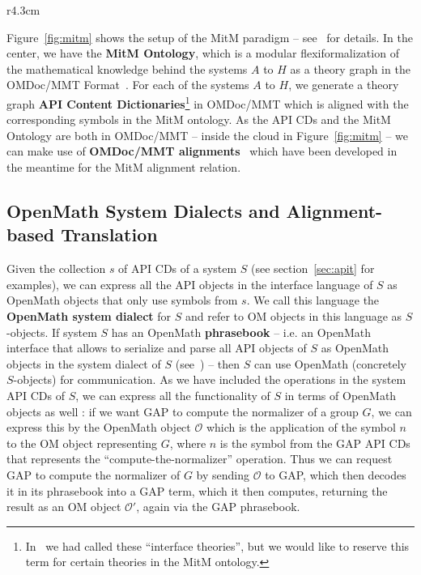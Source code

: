 \begin{wrapfigure}r{4.3cm}\vspace*{-2em}
  \vspace*{-1em}
  \caption{MitM Paradigm}\label{fig:mitm}\vspace*{-1.5em}
\end{wrapfigure}
Figure~\ref{fig:mitm} shows the setup of the MitM paradigm -- see~\cite{DehKohKon:iop16}
for details. In the center, we have the \textbf{MitM Ontology}, which is a modular
flexiformalization of the mathematical knowledge behind the systems $A$ to $H$ as a theory
graph in the OMDoc/MMT Format~\cite{Kohlhase:OMDoc1.2,RabKoh:WSMSML13,uniformal:on}. For
each of the systems $A$ to $H$, we generate a theory graph \textbf{API Content
  Dictionaries}\footnote{In~\cite{DehKohKon:iop16} we had called these ``interface
  theories'', but we would like to reserve this term for certain theories in the MitM
  ontology.}
in OMDoc/MMT which is aligned with the corresponding symbols in the MitM ontology. As the
API CDs and the MitM Ontology are both in OMDoc/MMT -- inside the cloud in
Figure~\ref{fig:mitm} -- we can make use of \textbf{OMDoc/MMT
  alignments}~\cite{MueGauKal:cacfms17} which have been developed in the meantime for the
MitM alignment relation.

\subsection{OpenMath System Dialects and Alignment-based Translation}\label{sec:mitm:dialect}

Given the collection $s$ of API CDs of a system $S$ (see section~\ref{sec:apit} for
examples), we can express all the API objects in the interface language of $S$ as OpenMath
objects that only use symbols from $s$.  We call this language the \textbf{OpenMath system
  dialect} for $S$ and refer to OM objects in this language as $S$-objects.  If system $S$
has an OpenMath \textbf{phrasebook} -- i.e. an OpenMath interface that allows to serialize
and parse all API objects of $S$ as OpenMath objects in the system dialect of $S$
(see~\cite[Section 1.5]{BusCapCar:2oms04}) -- then $S$ can use OpenMath (concretely
$S$-objects) for communication. As we have included the operations in the system API CDs
of $S$, we can express all the functionality of $S$ in terms of OpenMath objects as well :
if we want GAP to compute the normalizer of a group $G$, we can express this by the
OpenMath object $\mathcal{O}$ which is the application of the symbol $n$ to the OM object
representing $G$, where $n$ is the symbol from the GAP API CDs that represents the
``compute-the-normalizer'' operation.  Thus we can request GAP to compute the normalizer
of $G$ by sending $\mathcal{O}$ to GAP, which then decodes it in its phrasebook into a GAP
term, which it then computes, returning the result as an OM object $\mathcal{O}'$, again
via the GAP phrasebook.

